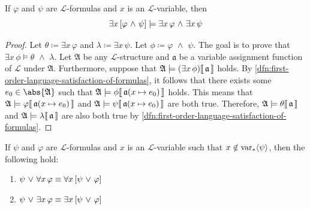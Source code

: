 \begin{thm}
     \label{logical-consequence:existentially-quantified-conjunction-implies-existentially-quantified-conjuncts}
    If \( \varphi \) and \( \psi \) are \( \mathcal{L} \)-formulas and \( x \) is an \( \mathcal{L} \)-variable, then
    \begin{equation*}
        \exists x \, \mleft[ \varphi \,\,{\land}\,\, \psi \mright] \models \exists x \, \varphi \,\,{\land}\,\, \exists x \, \psi
    \end{equation*}
\end{thm}

\begin{proof}
    Let \( \theta \coloneq \exists x \, \varphi \) and \( \lambda \coloneq \exists x \, \psi \). Let \( \phi \coloneq \varphi \,\,{\land}\,\, \psi \).
    The goal is to prove that \( \exists x \, \phi \models \theta \,\,{\land}\,\, \lambda \). Let \( \mathfrak{A} \) be any \( \mathcal{L} \)-structure
    and \( \mathfrak{a} \) be a variable assignment function of \( \mathcal{L} \) under \( \mathfrak{A} \).
    Furthermore, suppose that \( \folwffsatisfaction{\mathfrak{A}}{\mleft( \exists x \, \phi \mright)}{\mathfrak{a}} \) holds.
    By \cref{dfn:first-order-language-satisfaction-of-formulas}, it follows that there exists some \( e_{0} \in \abs{\mathfrak{A}} \)
    such that \( \folwffsatisfaction{\mathfrak{A}}{\phi}{ \folmodifiedvariableassignmentfunction{\mathfrak{a}}{x}{e_{0}} } \) holds.
    This means that \( \folwffsatisfaction{\mathfrak{A}}{\varphi}{ \folmodifiedvariableassignmentfunction{\mathfrak{a}}{x}{e_{0}} } \)
    and \( \folwffsatisfaction{\mathfrak{A}}{\psi}{ \folmodifiedvariableassignmentfunction{\mathfrak{a}}{x}{e_{0}} } \) are both true.
    Therefore, \(  \mathfrak{A} \models \theta\llbracket\, \mathfrak{a} \,\rrbracket \) and \(  \mathfrak{A} \models \lambda\llbracket\, \mathfrak{a} \,\rrbracket \)
    are also both true by \cref{dfn:first-order-language-satisfaction-of-formulas}.
\end{proof}

\begin{thm}
     \label{logical-equivalence:grouping-disjuncts-into-quantified-formula}
    If \( \psi \) and \( \varphi \) are \( \mathcal{L} \)-formulas and \( x \) is an \( \mathcal{L} \)-variable such that \( x \notin \operatorname{var}_{\ast} \langle\psi\rangle \), then
    the following hold:
    \begin{enumerate}[topsep=2pt,label=\textup{\texttt{(\alph*)}}]
        \item \( \psi \,\,{\lor}\,\, \forall x \, \varphi \equiv \forall x \, \mleft[ \psi \,\,{\lor}\,\, \varphi \mright] \)  \label{enum:disjunct-into-all}
        \item \( \psi \,\,{\lor}\,\, \exists x \, \varphi \equiv \exists x \, \mleft[ \psi \,\,{\lor}\,\, \varphi \mright] \)  \label{enum:disjunct-into-exists}
    \end{enumerate}
\end{thm}

